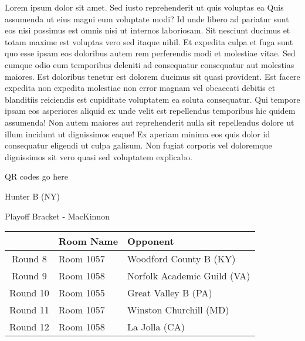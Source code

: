\documentclass{article}%
\begin{document}
\vspace*{8pt}%
\linebreak%
\newline%
\newline%
Lorem ipsum dolor sit amet. Sed iusto reprehenderit ut quis voluptas ea Quis assumenda ut eius magni eum voluptate modi? Id unde libero ad pariatur sunt eos nisi possimus est omnis nisi ut internos laboriosam. Sit nesciunt ducimus et totam maxime est voluptas vero sed itaque nihil. Et expedita culpa et fuga sunt quo esse ipsam eos doloribus autem rem perferendis modi et molestiae vitae.\newline%
\newline%
Sed cumque odio eum temporibus deleniti ad consequatur consequatur aut molestias maiores. Est doloribus tenetur est dolorem ducimus sit quasi provident. Est facere expedita non expedita molestiae non error magnam vel obcaecati debitis et blanditiis reiciendis est cupiditate voluptatem ea soluta consequatur. Qui tempore ipsam eos asperiores aliquid ex unde velit est repellendus temporibus hic quidem assumenda!\newline%
\newline%
Non autem maiores aut reprehenderit nulla sit repellendus dolore ut illum incidunt ut dignissimos eaque! Ex aperiam minima eos quis dolor id consequatur eligendi ut culpa galisum. Non fugiat corporis vel doloremque dignissimos sit vero quasi sed voluptatem explicabo.\newline%
\newline%
%
\vspace*{30pt}%
\begin{center}%
\begin{Huge}%
QR codes go here%
\end{Huge}%
\end{center}%
\newpage%
\begin{center}%
\begin{Huge}%
Hunter B (NY)%
\end{Huge}%
\vspace*{8pt}%
\linebreak%
\begin{Large}%
Playoff Bracket {-} MacKinnon%
\end{Large}%
\end{center}%
%
\begin{tabularx}{\textwidth}{|c|Y|Y|}%
\hline%
&Room Name&Opponent\\%
\hline%
Round 8&Room 1057&Woodford County B (KY)\\%
Round 9&Room 1058&Norfolk Academic Guild (VA)\\%
Round 10&Room 1055&Great Valley B (PA)\\%
Round 11&Room 1057&Winston Churchill (MD)\\%
Round 12&Room 1058&La Jolla (CA)\\%
\hline%
\end{tabularx}%
\end{document}

